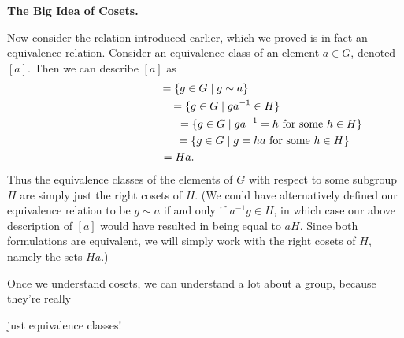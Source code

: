 \documentclass[12pt,letterpaper]{algebra_book}
\theoremstyle{definition}
\begin{document}
    \textcolor{blue!90!black!100}{\textbf{The Big Idea of Cosets.}}

    Now consider the relation introduced earlier, which we 
    proved is in fact an equivalence
    relation. Consider an equivalence class of an element $a \in G$,
    denoted $[a]$. Then we can describe $[a]$ as 
    \begin{gather*}
        [a] = \{g \in G \mid g \sim a \}\\
        \hspace{1.35cm} = \{g \in G \mid ga^{-1} \in H \}\\
        \hspace{4.2cm} = \{g \in G \mid ga^{-1} = h \text{ for some } h \in H \}\\
        \hspace{3.75cm} = \{g \in G \mid g = ha \text{ for some } h \in H \}\\
        \hspace{-1.7cm}= Ha.
    \end{gather*}
    Thus the equivalence classes of the elements of $G$ with respect
    to some subgroup $H$ are simply just the right cosets of $H$. (We
    could have alternatively defined our equivalence relation to be $g
    \sim a$ if and only if $a^{-1}g \in H$, in which case our above
    description of $[a]$ would have resulted in being equal to $aH$. Since both
    formulations are equivalent, we will simply work with the right
    cosets of $H$, namely the sets $Ha$.)

    \begin{figure}[h]
        \centering
    \end{figure}
    Once we understand cosets, we can understand a lot about a group,
    because they're really 
    
    just equivalence classes!
    \vspace{0.8cm}
\end{document}
